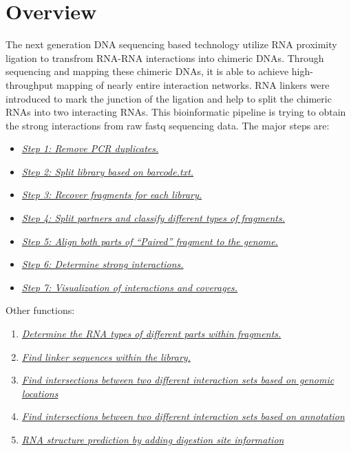 \documentclass[letterpaper,10pt,english]{sphinxmanual}
\begin{document}
\section{Overview}
\label{Analysis_pipeline:overview}
The next generation DNA sequencing based technology utilize RNA proximity ligation to transfrom RNA-RNA interactions into chimeric DNAs. Through sequencing and mapping these chimeric DNAs, it is able to achieve high-throughput mapping of nearly entire interaction networks. RNA linkers were introduced to mark the junction of the ligation and help to split the chimeric RNAs into two interacting RNAs.
This bioinformatic pipeline is trying to obtain the strong interactions from raw fastq sequencing data. The major steps are:
\begin{itemize}
\item {} 
{\hyperref[Analysis_pipeline:step1]{\emph{Step 1: Remove PCR duplicates.}}}

\item {} 
{\hyperref[Analysis_pipeline:step2]{\emph{Step 2: Split library based on barcode.txt.}}}

\item {} 
{\hyperref[Analysis_pipeline:step3]{\emph{Step 3: Recover fragments for each library.}}}

\item {} 
{\hyperref[Analysis_pipeline:step4]{\emph{Step 4: Split partners and classify different types of fragments.}}}

\item {} 
{\hyperref[Analysis_pipeline:step5]{\emph{Step 5: Align both parts of ``Paired'' fragment to the genome.}}}

\item {} 
{\hyperref[Analysis_pipeline:step6]{\emph{Step 6: Determine strong interactions.}}}

\item {} 
{\hyperref[Analysis_pipeline:step7]{\emph{Step 7: Visualization of interactions and coverages.}}}

\end{itemize}

Other functions:
\begin{enumerate}
\item {} 
{\hyperref[Analysis_pipeline:rna-types]{\emph{Determine the RNA types of different parts within fragments.}}}

\item {} 
{\hyperref[Analysis_pipeline:find-linker]{\emph{Find linker sequences within the library.}}}

\item {} 
{\hyperref[Analysis_pipeline:intersection]{\emph{Find intersections between two different interaction sets based on genomic locations}}}

\item {} 
{\hyperref[Analysis_pipeline:intersectiongene]{\emph{Find intersections between two different interaction sets based on annotation}}}

\item {} 
{\hyperref[Analysis_pipeline:structure]{\emph{RNA structure prediction by adding digestion site information}}}

\end{enumerate}
\end{document}
